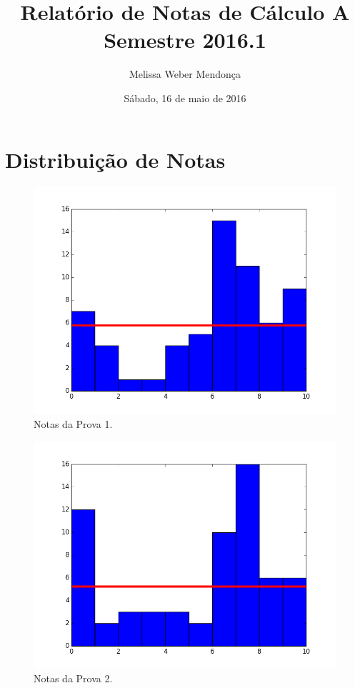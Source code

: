 \documentclass{article}
\title{Relatório de Notas de Cálculo A\\Semestre 2016.1}
\author{Melissa Weber Mendonça}
\date{Sábado, 16 de maio de 2016}
\begin{document}
\maketitle
\section*{Distribuição de Notas}
\begin{figure}[ht]
\begin{center}
\includegraphics{prova1.png}
\end{center}
\caption{Notas da Prova 1.}
\end{figure}
\begin{figure}[ht]
\begin{center}
\includegraphics{prova2.png}
\end{center}
\caption{Notas da Prova 2.}
\end{figure}
\end{document}
